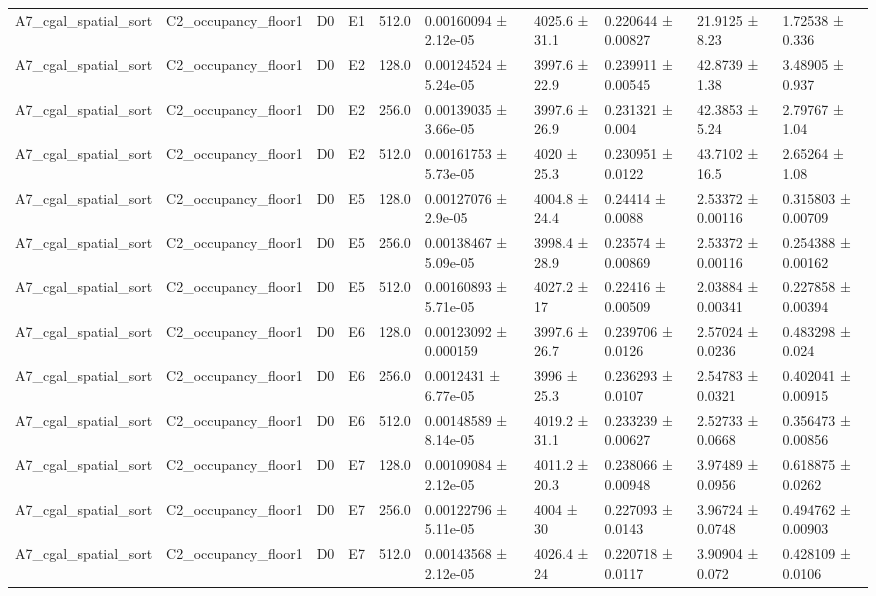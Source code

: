 \begin{table}
\begin{tabular}{llllllllll}
A7\_cgal\_spatial\_sort & C2\_occupancy\_floor1 & D0 & E1 & 512.0 & 0.00160094 ± 2.12e-05 & 4025.6 ± 31.1 & 0.220644 ± 0.00827 & 21.9125 ± 8.23 & 1.72538 ± 0.336 \\
A7\_cgal\_spatial\_sort & C2\_occupancy\_floor1 & D0 & E2 & 128.0 & 0.00124524 ± 5.24e-05 & 3997.6 ± 22.9 & 0.239911 ± 0.00545 & 42.8739 ± 1.38 & 3.48905 ± 0.937 \\
A7\_cgal\_spatial\_sort & C2\_occupancy\_floor1 & D0 & E2 & 256.0 & 0.00139035 ± 3.66e-05 & 3997.6 ± 26.9 & 0.231321 ± 0.004 & 42.3853 ± 5.24 & 2.79767 ± 1.04 \\
A7\_cgal\_spatial\_sort & C2\_occupancy\_floor1 & D0 & E2 & 512.0 & 0.00161753 ± 5.73e-05 & 4020 ± 25.3 & 0.230951 ± 0.0122 & 43.7102 ± 16.5 & 2.65264 ± 1.08 \\
A7\_cgal\_spatial\_sort & C2\_occupancy\_floor1 & D0 & E5 & 128.0 & 0.00127076 ± 2.9e-05 & 4004.8 ± 24.4 & 0.24414 ± 0.0088 & 2.53372 ± 0.00116 & 0.315803 ± 0.00709 \\
A7\_cgal\_spatial\_sort & C2\_occupancy\_floor1 & D0 & E5 & 256.0 & 0.00138467 ± 5.09e-05 & 3998.4 ± 28.9 & 0.23574 ± 0.00869 & 2.53372 ± 0.00116 & 0.254388 ± 0.00162 \\
A7\_cgal\_spatial\_sort & C2\_occupancy\_floor1 & D0 & E5 & 512.0 & 0.00160893 ± 5.71e-05 & 4027.2 ± 17 & 0.22416 ± 0.00509 & 2.03884 ± 0.00341 & 0.227858 ± 0.00394 \\
A7\_cgal\_spatial\_sort & C2\_occupancy\_floor1 & D0 & E6 & 128.0 & 0.00123092 ± 0.000159 & 3997.6 ± 26.7 & 0.239706 ± 0.0126 & 2.57024 ± 0.0236 & 0.483298 ± 0.024 \\
A7\_cgal\_spatial\_sort & C2\_occupancy\_floor1 & D0 & E6 & 256.0 & 0.0012431 ± 6.77e-05 & 3996 ± 25.3 & 0.236293 ± 0.0107 & 2.54783 ± 0.0321 & 0.402041 ± 0.00915 \\
A7\_cgal\_spatial\_sort & C2\_occupancy\_floor1 & D0 & E6 & 512.0 & 0.00148589 ± 8.14e-05 & 4019.2 ± 31.1 & 0.233239 ± 0.00627 & 2.52733 ± 0.0668 & 0.356473 ± 0.00856 \\
A7\_cgal\_spatial\_sort & C2\_occupancy\_floor1 & D0 & E7 & 128.0 & 0.00109084 ± 2.12e-05 & 4011.2 ± 20.3 & 0.238066 ± 0.00948 & 3.97489 ± 0.0956 & 0.618875 ± 0.0262 \\
A7\_cgal\_spatial\_sort & C2\_occupancy\_floor1 & D0 & E7 & 256.0 & 0.00122796 ± 5.11e-05 & 4004 ± 30 & 0.227093 ± 0.0143 & 3.96724 ± 0.0748 & 0.494762 ± 0.00903 \\
A7\_cgal\_spatial\_sort & C2\_occupancy\_floor1 & D0 & E7 & 512.0 & 0.00143568 ± 2.12e-05 & 4026.4 ± 24 & 0.220718 ± 0.0117 & 3.90904 ± 0.072 & 0.428109 ± 0.0106 \\

\end{tabular}
\end{table}
